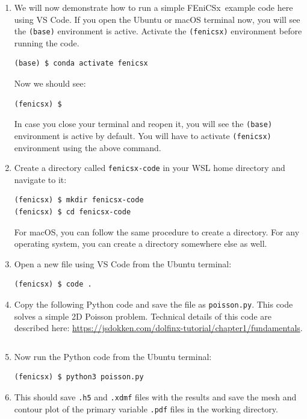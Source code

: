 \documentclass[12pt]{article}
\newcommand{\fenicsx}{\textsf{FEniCSx}}
\begin{document}
\begin{enumerate}[label={\arabic*.}, leftmargin= 0.6 cm,itemsep = 0.2cm,topsep=.2cm, parsep=0.2cm]

\item We will now demonstrate how to run a simple \fenicsx \ example code here using VS Code. If you open the Ubuntu or macOS terminal now, you will see the \texttt{(base)} environment is active. Activate the \texttt{(fenicsx)} environment before running the code.

\begin{lstlisting}[style=terminal]
(base) $ conda activate fenicsx
\end{lstlisting}

Now we should see:
\begin{lstlisting}[style=terminal]
(fenicsx) $ 
\end{lstlisting}

In case you close your terminal and reopen it, you will see the \texttt{(base)} environment is active by default. You will have to activate \texttt{(fenicsx)} environment using the above command.

\item Create a directory called \texttt{fenicsx-code} in your WSL home directory and navigate to it:

\begin{lstlisting}[style=terminal]
(fenicsx) $ mkdir fenicsx-code
(fenicsx) $ cd fenicsx-code
\end{lstlisting}

For macOS, you can follow the same procedure to create a directory. For any operating system, you can create a directory somewhere else as well.

\item Open a new file using VS Code from the Ubuntu terminal:

\begin{lstlisting}[style=terminal]
(fenicsx) $ code .
\end{lstlisting}

\item Copy the following Python code and save the file as \texttt{poisson.py}. This code solves a simple 2D Poisson problem. Technical details of this code are described here: \url{https://jsdokken.com/dolfinx-tutorial/chapter1/fundamentals}.
\inputminted[breaklines, breakafter=\_]{python}{fenicsx_examples/poisson.py}

\item Now run the Python code from the Ubuntu terminal:
\begin{lstlisting}[style=terminal]
(fenicsx) $ python3 poisson.py
\end{lstlisting}

\item This should save \texttt{.h5} and \texttt{.xdmf} files with the results and save the mesh and contour plot of the primary variable \texttt{.pdf} files in the working directory.
\end{enumerate}
\end{document}
